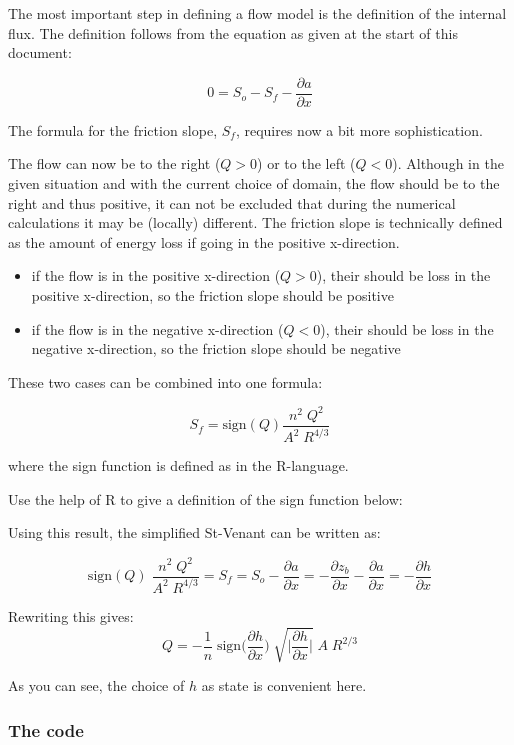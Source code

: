 \documentclass[
]{article}
\providecommand{\tightlist}{%
  \setlength{\itemsep}{0pt}\setlength{\parskip}{0pt}}
\begin{document}
The most important step in defining a flow model is the definition of
the internal flux. The definition follows from the equation as given at
the start of this document:

\[
0 =  S_o - S_f - \frac{\partial a}{\partial x} 
\]

The formula for the friction slope, \(S_f\), requires now a bit more
sophistication.

The flow can now be to the right (\(Q>0\)) or to the left (\(Q<0\)).
Although in the given situation and with the current choice of domain,
the flow should be to the right and thus positive, it can not be
excluded that during the numerical calculations it may be (locally)
different. The friction slope is technically defined as the amount of
energy loss if going in the positive x-direction.

\begin{itemize}
\tightlist
\item
  if the flow is in the positive x-direction (\(Q>0\)), their should be
  loss in the positive x-direction, so the friction slope should be
  positive
\item
  if the flow is in the negative x-direction (\(Q<0\)), their should be
  loss in the negative x-direction, so the friction slope should be
  negative
\end{itemize}

These two cases can be combined into one formula:

\[
S_f = \mathrm{sign}(Q) \frac{n^2\; Q^2}{A^2\; R^{4/3}} 
\]

where the sign function is defined as in the R-language.

Use the help of R to give a definition of the sign function below:

Using this result, the simplified St-Venant can be written as:

\[
 \mathrm{sign}(Q) \; 
 \frac{n^2\; Q^2}{A^2\; R^{4/3}} = S_f = S_o - \frac{\partial a}{\partial x}  = 
 -\frac{\partial z_b}{\partial x} - \frac{\partial a}{\partial x} = 
 -\frac{\partial h}{\partial x}
\]

Rewriting this gives:
\[Q  = -\frac{1}{n}\; \mathrm{sign}\Big(\frac{\partial h}{\partial x}\Big)\; \sqrt{ \Big| \frac{\partial h}{\partial x} \Big|}\; A\; R^{2/3}\]

As you can see, the choice of \(h\) as state is convenient here.

\hypertarget{the-code}{%
\subsubsection{The code}\label{the-code}}
\end{document}

